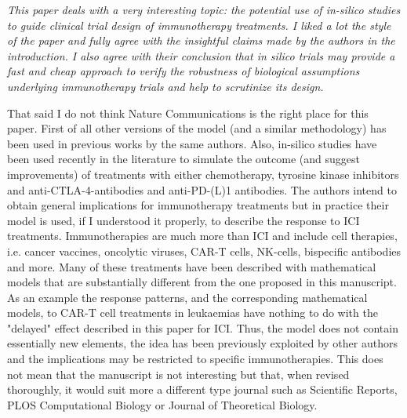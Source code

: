\documentclass{article}
\newcommand{\revr}[1]{{\color{gray} \itshape #1}}
\begin{document}
\revr{This paper deals with a very interesting topic: the potential use of in-silico studies to guide clinical trial design of immunotherapy treatments. I liked a lot the style of the paper and fully agree with the insightful claims made by the authors in the introduction. I also agree with their conclusion that in silico trials may provide a fast and cheap approach to verify the robustness of biological assumptions underlying immunotherapy trials and help to scrutinize its design.

That said I do not think Nature Communications is the right place for this paper. First of all other versions of the model (and a similar methodology) has been used in previous works by the same authors. Also, in-silico studies have been used recently in the literature to simulate the outcome (and suggest improvements) of treatments with either chemotherapy, tyrosine kinase inhibitors and anti-CTLA-4-antibodies and anti-PD-(L)1 antibodies. The authors intend to obtain general implications for immunotherapy treatments but in practice their model is used, if I understood it properly, to describe the response to ICI treatments. Immunotherapies are much more than ICI and include cell therapies, i.e. cancer vaccines, oncolytic viruses, CAR-T cells, NK-cells, bispecific antibodies and more. Many of these treatments have been described with mathematical models that are substantially different from the one proposed in this manuscript. As an example the response patterns, and the corresponding mathematical models, to CAR-T cell treatments in leukaemias have nothing to do with the "delayed" effect described in this paper for ICI. Thus, the model does not contain essentially new elements, the idea has been previously exploited by other authors and the implications may be restricted to specific immunotherapies. This does not mean that the manuscript is not interesting but that, when revised thoroughly, it would suit more a different type journal such as Scientific Reports, PLOS Computational Biology or Journal of Theoretical Biology.}
\end{document}
